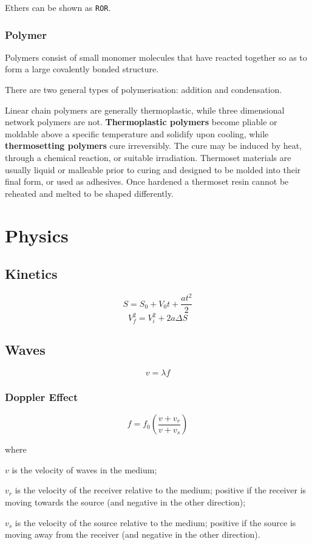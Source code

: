 \documentclass[oneside]{book} %
\theoremstyle{plain}
\begin{document}
Ethers can be shown as \texttt{ROR}.

\section{Polymer}
Polymers consist of small monomer molecules that have reacted together so as to
form a large covalently bonded structure.

There are two general types of polymerisation: addition and condensation.

Linear chain polymers are generally thermoplastic, while three dimensional
network polymers are not. \textbf{Thermoplastic polymers} become pliable or
moldable above a specific temperature and solidify upon cooling, while
\textbf{thermosetting polymers} cure irreversibly. The cure may be induced by
heat, through a chemical reaction, or suitable irradiation. Thermoset materials
are usually liquid or malleable prior to curing and designed to be molded into
their final form, or used as adhesives. Once hardened a thermoset resin cannot
be reheated and melted to be shaped differently.

\part{Physics}

\chapter{Kinetics}
\[S = S_0 + V_0 t + \frac{a t^2}{2}\]
\[V_f^2 = V_i^2 + 2 a \Delta S\]

\chapter{Waves}
\[v = \lambda f\]

\section{Doppler Effect}
\[f = f_0 \left ( \frac{v + v_r}{v + v_s} \right )\]

where

\(v\) is the velocity of waves in the medium;

\(v_r\) is the velocity of the receiver relative to the medium; positive if the
receiver is moving towards the source (and negative in the other direction);

\(v_s\) is the velocity of the source relative to the medium; positive if the
source is moving away from the receiver (and negative in the other direction).
\end{document}
